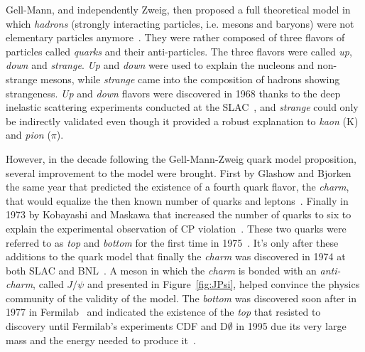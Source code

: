 	Gell-Mann, and independently Zweig, then proposed a full theoretical model in which \textit{hadrons} (strongly interacting particles, i.e. mesons and baryons) were not elementary particles anymore~\cite{GELLMANN1964,ZWEIG1964I,ZWEIG1964II}. They were rather composed of three flavors of particles called \textit{quarks} and their anti-particles. The three flavors were called \textit{up}, \textit{down} and \textit{strange}. \textit{Up} and \textit{down} were used to explain the nucleons and non-strange mesons, while \textit{strange} came into the composition of hadrons showing strangeness. \textit{Up} and \textit{down} flavors were discovered in 1968 thanks to the deep inelastic scattering experiments conducted at the \acf{SLAC}~\cite{BLOOM1969,BREIDENBACH1969}, and \textit{strange} could only be indirectly validated even though it provided a robust explanation to \textit{kaon} (K) and \textit{pion} ($\pi$).
	
	However, in the decade following the Gell-Mann-Zweig quark model proposition, several improvement to the model were brought. First by Glashow and Bjorken the same year that predicted the existence of a fourth quark flavor, the \textit{charm}, that would equalize the then known number of quarks and leptons~\cite{BJORKEN1964,GLASHOW1970}. Finally in 1973 by Kobayashi and Maskawa that increased the number of quarks to six to explain the experimental observation of CP violation~\cite{CHRISTENSON1964,KOBAYASHI1973}. These two quarks were referred to as \textit{top} and \textit{bottom} for the first time in 1975~\cite{HARARI1975}. It's only after these additions to the quark model that finally the \textit{charm} was discovered in 1974 at both SLAC and \acf{BNL}~\cite{RICHTER1974,TING1974}. A meson in which the \textit{charm} is bonded with an \textit{anti-charm}, called $J/\psi$ and presented in Figure~\ref{fig:JPsi}, helped convince the physics community of the validity of the model. The \textit{bottom} was discovered soon after in 1977 in Fermilab~\cite{HERB1977} and indicated the existence of the \textit{top} that resisted to discovery until Fermilab's experiments CDF and D$\emptyset$ in 1995 due its very large mass and the energy needed to produce it~\cite{ABASHI1995,ABE1995}.
	
